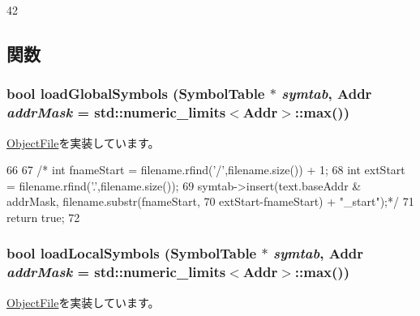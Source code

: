 \begin{DoxyCode}
42 {}
\end{DoxyCode}


\subsection{関数}
\hypertarget{classRawObject_a1de102f86bbb53d20455d9e78be53935}{
\subsubsection[{loadGlobalSymbols}]{\setlength{\rightskip}{0pt plus 5cm}bool loadGlobalSymbols ({\bf SymbolTable} $\ast$ {\em symtab}, \/  {\bf Addr} {\em addrMask} = {\ttfamily std::numeric\_\-limits$<${\bf Addr}$>$::max()})}}
\label{classRawObject_a1de102f86bbb53d20455d9e78be53935}


\hyperlink{classObjectFile_abd8b86c98494f055ba7e0babbd55f4a0}{ObjectFile}を実装しています。


\begin{DoxyCode}
66 {
67 /*    int fnameStart = filename.rfind('/',filename.size()) + 1;
68     int extStart = filename.rfind('.',filename.size());
69     symtab->insert(text.baseAddr & addrMask, filename.substr(fnameStart,
70                 extStart-fnameStart) + "_start");*/
71     return true;
72 }
\end{DoxyCode}
\hypertarget{classRawObject_aab9393b89c15838ac1b842e642f981bb}{
\subsubsection[{loadLocalSymbols}]{\setlength{\rightskip}{0pt plus 5cm}bool loadLocalSymbols ({\bf SymbolTable} $\ast$ {\em symtab}, \/  {\bf Addr} {\em addrMask} = {\ttfamily std::numeric\_\-limits$<${\bf Addr}$>$::max()})}}
\label{classRawObject_aab9393b89c15838ac1b842e642f981bb}


\hyperlink{classObjectFile_a15e7fbacc339ac9a4d50e4aa36591339}{ObjectFile}を実装しています。


